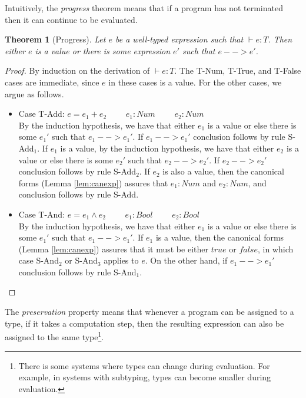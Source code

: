 \documentclass[tese,capa,english]{texufpel}
\newtheorem{theorem}{Theorem}
\begin{document}
Intuitively, the \emph{progress} theorem means that if a program has not terminated then it can continue to be evaluated. 

\begin{theorem}[Progress]
Let $e$ be a well-typed expression such that $\vdash e : T$. Then either $e$ is a value or there is some expression $e'$ such that $e --> e'$.
\end{theorem}

\begin{proof}
By induction on the derivation of $\vdash e : T$. The {\footnotesize\textrm{T-Num}}, {\footnotesize\textrm{T-True}}, and {\footnotesize\textrm{T-False}} cases are immediate, since $e$ in these cases is a value. For the other cases, we argue as follows.
\begin{itemize}
\item Case {\footnotesize\textrm{T-Add}}: $e = e_1 + e_2$ \ \ \ \ $e_1 : Num$ \ \ \ \ $e_2 : Num$ \vspace{5pt} \\
By the induction hypothesis, we have that either $e_1$ is a value or else there is some $e_1'$ such that $e_1 --> e_1'$. If $e_1 --> e_1'$ conclusion follows by rule {\footnotesize\textrm{S-Add$_1$}}. If $e_1$ is a value, by the induction hypothesis, we have that either $e_2$ is a value or else there is some $e_2'$ such that $e_2 --> e_2'$. If $e_2 --> e_2'$ conclusion follows by rule {\footnotesize\textrm{S-Add$_2$}}. If $e_2$ is also a value, then the canonical forms (Lemma \ref{lem:canexp}) assures that $e_1 : Num$ and $e_2 : Num$, and conclusion follows by rule {\footnotesize\textrm{S-Add}}.
\item Case {\footnotesize\textrm{T-And}}: $e = e_1 \wedge e_2$ \ \ \ \ $e_1 : Bool$ \ \ \ \ $e_2 : Bool$ \vspace{5pt} \\
By the induction hypothesis, we have that either $e_1$ is a value or else there is some $e_1'$ such that $e_1 --> e_1'$. If $e_1$ is a value, then the canonical forms (Lemma \ref{lem:canexp}) assures that it must be either $true$ or $false$, in which case {\footnotesize\textrm{S-And$_2$}} or {\footnotesize\textrm{S-And$_3$}} applies to $e$. On the other hand, if $e_1 --> e_1'$ conclusion follows by rule {\footnotesize\textrm{S-And$_1$}}.
\end{itemize}
\vspace{-2ex}
\end{proof}

The \emph{preservation} property means that whenever a program can be assigned to a type, if it takes a computation step, then the resulting expression can also be assigned to the same type\footnote{There is some systems where types can change during evaluation. For example, in systems with subtyping, types can become smaller during evaluation.}.
\end{document}
